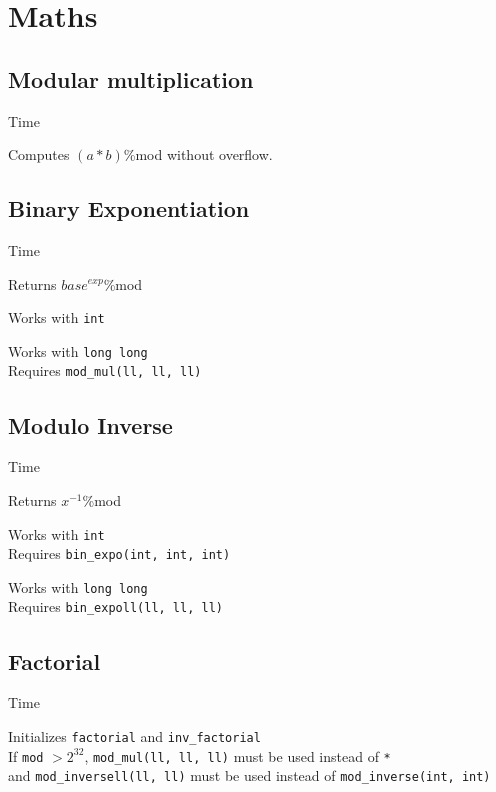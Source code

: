 \section{Maths}


\subsection{Modular multiplication}
 Time

Computes $(a * b)$\:\%\:mod without overflow.



\subsection{Binary Exponentiation}
 Time

Returns ${base^{exp}}$\:\%\:mod

Works with \verb|int|


Works with \verb|long long| \\
Requires \verb|mod_mul(ll, ll, ll)|



\subsection{Modulo Inverse}
 Time

Returns ${x^{-1}}$\:\%\:mod

Works with \verb|int| \\
Requires \verb|bin_expo(int, int, int)|



Works with \verb|long long| \\
Requires \verb|bin_expoll(ll, ll, ll)|



\subsection{Factorial}
 Time

Initializes \verb|factorial| and \verb|inv_factorial| \\
If \verb|mod| $> 2^{32}$, \verb|mod_mul(ll, ll, ll)| must be used instead of \verb|*| \\
and \verb|mod_inversell(ll, ll)| must be used instead of \verb|mod_inverse(int, int)|


